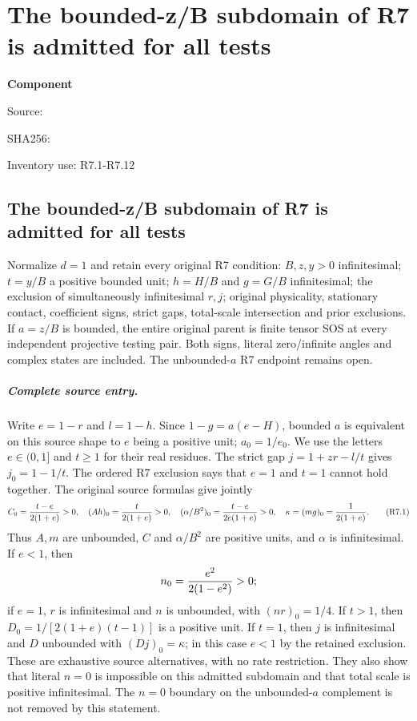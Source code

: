 \chapter{The bounded-z/B subdomain of R7 is admitted for all tests}
\label{component:p9a223c96c696}
\noindent\textbf{Component }\par
{\small\noindent Source: \par}
{\small\noindent SHA256: \par}
{\small\noindent Inventory use: R7.1-R7.12\par}
\medskip
\section{The bounded-z/B subdomain of R7 is admitted for all tests}
\label{p9a223c96c696:sec:r17-r7-bounded-a}
\begin{theorem}
Normalize $d=1$ and retain every original R7 condition: $B,z,y>0$
infinitesimal; $t=y/B$ a positive bounded unit; $h=H/B$ and $g=G/B$
infinitesimal; the exclusion of simultaneously infinitesimal $r,j$;
original physicality, stationary contact, coefficient signs, strict gaps,
total-scale intersection and prior exclusions. If $a=z/B$ is bounded,
the entire original parent is finite tensor SOS at every independent
projective testing pair. Both signs, literal zero/infinite angles and
complex states are included. The unbounded-$a$ R7 endpoint remains open.
\end{theorem}

\paragraph{Complete source entry.}
Write $e=1-r$ and $l=1-h$. Since $1-g=a(e-H)$, bounded $a$ is equivalent
on this source shape to $e$ being a positive unit; $a_0=1/e_0$.
We use the letters $e\in(0,1]$ and $t\ge1$ for their real residues.
The strict gap $j=1+zr-l/t$ gives $j_0=1-1/t$. The ordered R7 exclusion
says that $e=1$ and $t=1$ cannot hold together. The original source formulas
give jointly
\[
 C_0={t-e\over2(1+e)}>0,\quad
 (Ah)_0={t\over2(1+e)}>0,\quad
 (\alpha/B^2)_0={t-e\over2e(1+e)}>0,\quad
 \kappa=(mg)_0={1\over2(1+e)}.                        \tag{R7.1}
\]
Thus $A,m$ are unbounded, $C$ and $\alpha/B^2$ are positive units,
and $\alpha$ is infinitesimal. If $e<1$, then
\[
 n_0={e^2\over2(1-e^2)}>0;
\]
if $e=1$, $r$ is infinitesimal and $n$ is unbounded, with $(nr)_0=1/4$.
If $t>1$, then $D_0=1/[2(1+e)(t-1)]$ is a positive unit. If $t=1$,
then $j$ is infinitesimal and $D$ unbounded with $(Dj)_0=\kappa$;
in this case $e<1$ by the retained exclusion. These are exhaustive
source alternatives, with no rate restriction. They also show that
literal $n=0$ is impossible on this admitted subdomain and that total
scale is positive infinitesimal. The $n=0$ boundary on the unbounded-$a$
complement is not removed by this statement.

